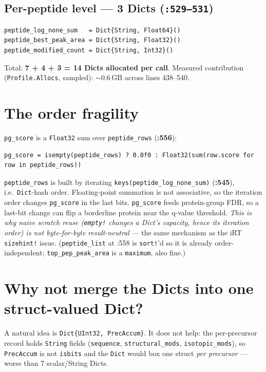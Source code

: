 \documentclass[11pt]{article}
\begin{document}
\subsection*{Per-peptide level --- 3 Dicts (\texttt{:529--531})}
\begin{lstlisting}[firstnumber=529]
peptide_log_none_sum   = Dict{String, Float64}()
peptide_best_peak_area = Dict{String, Float32}()
peptide_modified_count = Dict{String, Int32}()
\end{lstlisting}
Total: \textbf{7 + 4 + 3 = 14 Dicts allocated per call}. Measured contribution
(\texttt{Profile.Allocs}, sampled): $\sim$0.6\,GB across lines 438--540.

\section{The order fragility}\label{sec:fragility}
\texttt{pg\_score} is a \texttt{Float32} sum over \texttt{peptide\_rows}
(\textbf{:556}):
\begin{lstlisting}[firstnumber=556]
pg_score = isempty(peptide_rows) ? 0.0f0 : Float32(sum(row.score for row in peptide_rows))
\end{lstlisting}
\texttt{peptide\_rows} is built by iterating \texttt{keys(peptide\_log\_none\_sum)}
(\textbf{:545}), i.e.\ \texttt{Dict}-hash order. Floating-point summation is not
associative, so the iteration order changes \texttt{pg\_score} in the last bits.
\texttt{pg\_score} feeds protein-group FDR, so a last-bit change can flip a borderline
protein near the q-value threshold. \emph{This is why naive scratch reuse
(\texttt{empty!} changes a Dict's capacity, hence its iteration order) is not
byte-for-byte result-neutral} --- the same mechanism as the iRT \texttt{sizehint!}
issue. (\texttt{peptide\_list} at :558 is \texttt{sort!}'d so it is already
order-independent; \texttt{top\_pep\_peak\_area} is a \texttt{maximum}, also fine.)

\section{Why not merge the Dicts into one struct-valued Dict?}
A natural idea is \texttt{Dict\{UInt32, PrecAccum\}}. It does not help: the per-precursor
record holds \texttt{String} fields (\texttt{sequence}, \texttt{structural\_mods},
\texttt{isotopic\_mods}), so \texttt{PrecAccum} is not \texttt{isbits} and the \texttt{Dict}
would box one struct \emph{per precursor} --- worse than 7 scalar/String Dicts.
\end{document}
